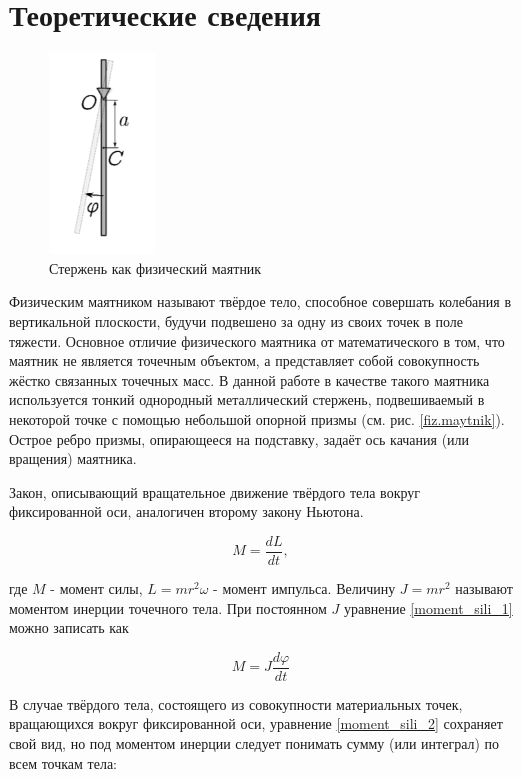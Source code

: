 \documentclass[a4paper,12pt]{article}
\begin{document}
\section{Теоретические сведения}

\begin{figure}
\includegraphics[width=0.25\textwidth]{fiz.maytnik.png}
\caption{Стержень как физический маятник} \label{fiz.maytnik}
\end{figure}


Физическим маятником называют твёрдое тело, способное совершать колебания в вертикальной плоскости,
будучи подвешено за одну из своих точек в поле тяжести.
Основное отличие физического маятника от математического в том, что маятник не является точечным объектом,
а представляет собой совокупность жёстко связанных точечных масс. В данной работе в качестве такого маятника
используется тонкий однородный металлический стержень, подвешиваемый в некоторой точке с помощью небольшой опорной призмы (см. рис. \eqref{fiz.maytnik}). Острое ребро
призмы, опирающееся на подставку, задаёт ось качания
(или вращения) маятника.


Закон, описывающий вращательное движение твёрдого тела вокруг фиксированной оси, аналогичен второму закону Ньютона.

\begin{equation}\label{moment_sili_1}
M = \dfrac{dL}{dt},
\end{equation}

где $M$ - момент силы, $L = mr^{2}\omega$ - момент импульса. Величину $J = mr^{2}$ называют моментом инерции точечного тела. При постоянном $J$ уравнение \eqref{moment_sili_1} можно записать как

\begin{equation}\label{moment_sili_2}
M = J\dfrac{d\varphi}{dt}
\end{equation}


В случае твёрдого тела, состоящего из совокупности материальных точек, вращающихся вокруг фиксированной оси,
уравнение \eqref{moment_sili_2} сохраняет свой вид, но под моментом инерции следует понимать сумму (или интеграл) по всем точкам тела:
\end{document}
